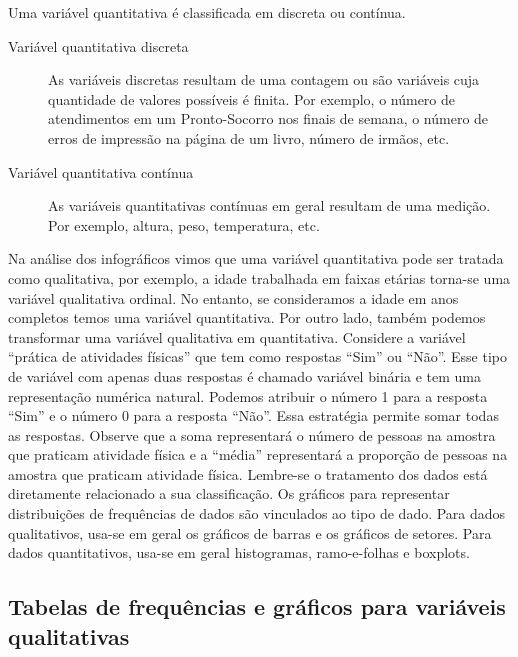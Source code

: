 Uma variável quantitativa é classificada em discreta ou contínua.

\begin{description}
\item[{Variável quantitativa discreta}] \leavevmode{}\label{est1-def-11}
As variáveis discretas resultam de uma contagem ou são variáveis cuja quantidade de valores possíveis é finita. Por exemplo, o número de atendimentos em um Pronto-Socorro nos finais de semana, o número de erros de impressão na página de um livro, número de irmãos, etc.

\end{description}
\begin{description}
\item[{Variável quantitativa contínua}] \leavevmode{}\label{est1-def-12}
As variáveis quantitativas contínuas em geral resultam de uma medição. Por exemplo, altura, peso, temperatura, etc.
\end{description}


\begin{observation}{}
Na análise dos infográficos vimos que uma variável quantitativa pode ser tratada como qualitativa, por exemplo, a idade trabalhada em faixas etárias torna-se uma variável qualitativa ordinal. No entanto, se consideramos a idade em anos completos temos uma variável quantitativa. Por outro lado, também podemos transformar uma variável qualitativa em quantitativa. Considere a variável “prática de atividades físicas”{} que tem como respostas “Sim”{} ou “Não”. Esse tipo de variável com apenas duas respostas é chamado variável binária e tem uma representação numérica natural. Podemos atribuir o número 1 para a resposta “Sim”{} e o número 0 para a resposta “Não”{}. Essa estratégia permite somar todas as respostas. Observe que a soma representará o número de pessoas na amostra que praticam atividade física e a “média”{} representará a proporção de pessoas na amostra que praticam atividade física. Lembre-se o tratamento dos dados está diretamente relacionado a sua classificação. Os gráficos para representar distribuições de frequências de dados são vinculados ao tipo de dado. Para dados qualitativos, usa-se em geral os gráficos de barras e os gráficos de setores. Para dados quantitativos, usa-se em geral histogramas, ramo-e-folhas e boxplots.
\end{observation}

\subsection{Tabelas de frequências e gráficos para variáveis qualitativas}

